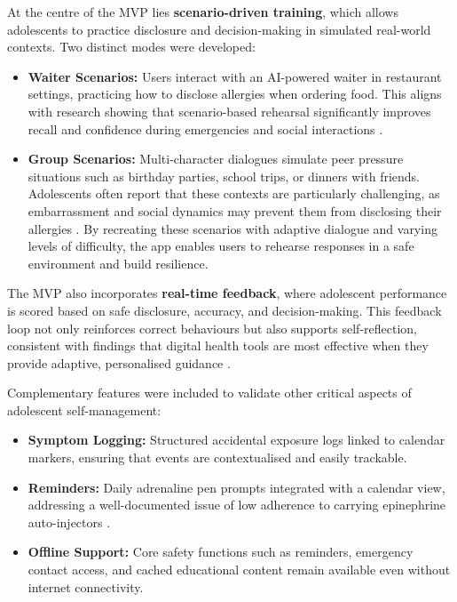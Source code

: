 \documentclass[MScCS]{uccthesis}
\begin{document}
At the centre of the MVP lies \textbf{scenario-driven training}, which allows adolescents to practice disclosure and decision-making in simulated real-world contexts. Two distinct modes were developed:  
\begin{itemize}
    \item \textbf{Waiter Scenarios:} Users interact with an AI-powered waiter in restaurant settings, practicing how to disclose allergies when ordering food. This aligns with research showing that scenario-based rehearsal significantly improves recall and confidence during emergencies and social interactions \parencite{gajardo2023gamification}.  
    \item \textbf{Group Scenarios:} Multi-character dialogues simulate peer pressure situations such as birthday parties, school trips, or dinners with friends. Adolescents often report that these contexts are particularly challenging, as embarrassment and social dynamics may prevent them from disclosing their allergies \parencite{sullivan2024telehealth}. By recreating these scenarios with adaptive dialogue and varying levels of difficulty, the app enables users to rehearse responses in a safe environment and build resilience.  
\end{itemize}  

The MVP also incorporates \textbf{real-time feedback}, where adolescent performance is scored based on safe disclosure, accuracy, and decision-making. This feedback loop not only reinforces correct behaviours but also supports self-reflection, consistent with findings that digital health tools are most effective when they provide adaptive, personalised guidance \parencite{matricardi2020mhealth}.  

Complementary features were included to validate other critical aspects of adolescent self-management:  
\begin{itemize}
    \item \textbf{Symptom Logging:} Structured accidental exposure logs linked to calendar markers, ensuring that events are contextualised and easily trackable.  
    \item \textbf{Reminders:} Daily adrenaline pen prompts integrated with a calendar view, addressing a well-documented issue of low adherence to carrying epinephrine auto-injectors \parencite{kwen2022foodallergy}.  
    \item \textbf{Offline Support:} Core safety functions such as reminders, emergency contact access, and cached educational content remain available even without internet connectivity.  
\end{itemize}  
\end{document}
